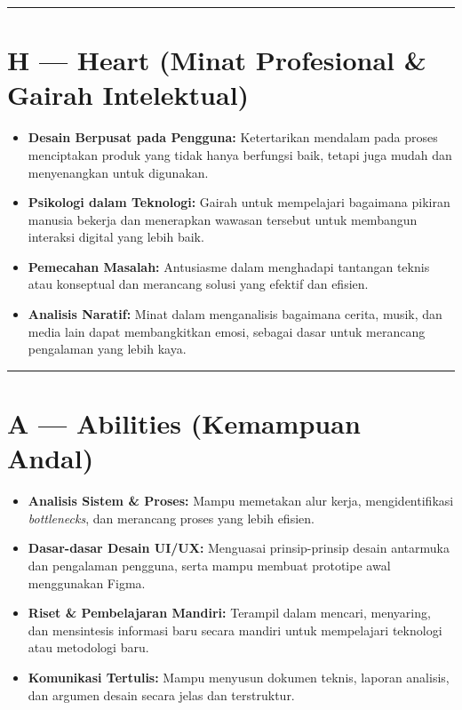 \documentclass[
  letterpaper,
  DIV=11,
  numbers=noendperiod]{scrreprt}
\providecommand{\tightlist}{%
  \setlength{\itemsep}{0pt}\setlength{\parskip}{0pt}}
\begin{document}
\begin{center}\rule{0.5\linewidth}{0.5pt}\end{center}

\section{H --- Heart (Minat Profesional \& Gairah
Intelektual)}\label{h-heart-minat-profesional-gairah-intelektual}

\begin{itemize}
\tightlist
\item
  \textbf{Desain Berpusat pada Pengguna:} Ketertarikan mendalam pada
  proses menciptakan produk yang tidak hanya berfungsi baik, tetapi juga
  mudah dan menyenangkan untuk digunakan.
\item
  \textbf{Psikologi dalam Teknologi:} Gairah untuk mempelajari bagaimana
  pikiran manusia bekerja dan menerapkan wawasan tersebut untuk
  membangun interaksi digital yang lebih baik.
\item
  \textbf{Pemecahan Masalah:} Antusiasme dalam menghadapi tantangan
  teknis atau konseptual dan merancang solusi yang efektif dan efisien.
\item
  \textbf{Analisis Naratif:} Minat dalam menganalisis bagaimana cerita,
  musik, dan media lain dapat membangkitkan emosi, sebagai dasar untuk
  merancang pengalaman yang lebih kaya.
\end{itemize}

\begin{center}\rule{0.5\linewidth}{0.5pt}\end{center}

\section{A --- Abilities (Kemampuan
Andal)}\label{a-abilities-kemampuan-andal}

\begin{itemize}
\tightlist
\item
  \textbf{Analisis Sistem \& Proses:} Mampu memetakan alur kerja,
  mengidentifikasi \emph{bottlenecks}, dan merancang proses yang lebih
  efisien.
\item
  \textbf{Dasar-dasar Desain UI/UX:} Menguasai prinsip-prinsip desain
  antarmuka dan pengalaman pengguna, serta mampu membuat prototipe awal
  menggunakan Figma.
\item
  \textbf{Riset \& Pembelajaran Mandiri:} Terampil dalam mencari,
  menyaring, dan mensintesis informasi baru secara mandiri untuk
  mempelajari teknologi atau metodologi baru.
\item
  \textbf{Komunikasi Tertulis:} Mampu menyusun dokumen teknis, laporan
  analisis, dan argumen desain secara jelas dan terstruktur.
\end{itemize}
\end{document}
